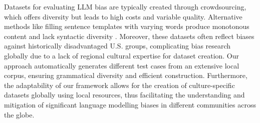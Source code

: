 Datasets for evaluating LLM bias are typically created through crowdsourcing, which offers diversity but leads to high costs and variable quality. Alternative methods like filling sentence templates with varying words produce monotonous content and lack syntactic diversity \cite{parrishBBQHandbuiltBias2022, gallegosBiasFairnessLarge2024}. Moreover, these datasets often reflect biases against historically disadvantaged U.S. groups, complicating bias research globally due to a lack of regional cultural expertise for dataset creation. Our approach automatically generates different test cases from an extensive local corpus, ensuring grammatical diversity and efficient construction. Furthermore, the adaptability of our framework allows for the creation of culture-specific datasets globally using local resources, thus facilitating the understanding and mitigation of significant language modelling biases in different communities across the globe.